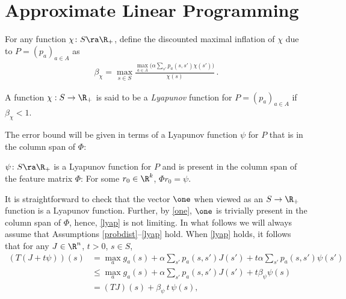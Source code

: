 \section{Approximate Linear Programming}
\begin{comment}
The approximate linear program (ALP) is obtained by making use of LFA in the LP, i.e., by adding the extra constraint $J=\Phi r$ in \eqref{mdplpshort} with $\Phi \in \R^{n\times k}$ and introducing 
the new variables $r\in \R^k$. 
By substitution, this leads to
\begin{align}\label{alp}
\begin{split}
\min_{r\in \R^k}\, &c^\top \Phi r\\
\text{s.t.}\mb &\Phi r\geq T \Phi r.
\end{split}
\end{align}
Unless specified otherwise we use $\tr$ to denote any solution 
to the ALP and $\tj=\Phi \tr$ to denote the corresponding approximate value function. 
\end{comment}
For any function $\chi\colon S\ra \R_+$, define the discounted maximal inflation of $\chi$ due to $P = (p_a)_{a\in A}$ as
\begin{align*}
\beta_{\chi}=\max_{s \in S} \frac{\underset{a \in A}{\max}\big(\alpha\sum_{s'}p_a(s,s')\chi(s')\big)}{\chi(s)}\,.
\end{align*}
\begin{definition}
A function $\chi:S\to\R_+$ is said to be a \emph{Lyapunov} function for $P = (p_a)_{a\in A}$ 
	if $\beta_{\chi}<1$.
\end{definition}
The error bound will be given in terms of a Lyapunov function $\psi$ for $P$ that is in the column span of $\Phi$:
\begin{assumption}\label{lyap}
$\psi\colon S \ra \R_+$ is a Lyapunov function for $P$
and is present in the column span of the feature matrix $\Phi$: For some $r_0\in \R^k$, $\Phi r_0 = \psi$.
\end{assumption}
It is straightforward to check that the vector $\one$ when viewed as an $S \to \R_+$ function 
is a Lyapunov function. Further, by \cref{one}, $\one$ is trivially present in the column span of $\Phi$, 
hence, \cref{lyap} is not limiting.
In what follows we will always assume that Assumptions \ref{probdist}--\ref{lyap} hold. 
When \cref{lyap} holds, it follows that for any $J\in \R^n$, $t>0$, $s\in S$,
\begin{align*}
(T(J+ t \psi))(s) &= 
\max_{a} g_a(s) + \alpha \sum_{s'} p_a(s,s') J(s') + t \alpha  \sum_{s'} p_a(s,s') \psi(s') \\
& \le 
\max_{a} g_a(s) + \alpha \sum_{s'} p_a(s,s') J(s') + t \beta_{\psi} \psi(s) \\
& = (T J)(s) + \beta_{\psi}\,t\,  \psi(s),
\end{align*}
